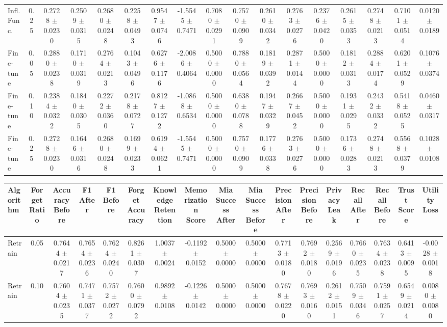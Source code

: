 \begin{table}[t]
\begin{tabular}{lcccccccccccccccc}
Infl. Func. & 0.25 & 0.2728 $\pm$ 0.0230 & 0.2509 $\pm$ 0.0315 & 0.2680 $\pm$ 0.0248 & 0.2258 $\pm$ 0.0493 & 0.9547 $\pm$ 0.0746 & -1.5545 $\pm$ 0.7471 & 0.7080 $\pm$ 0.0291 & 0.7570 $\pm$ 0.0909 & 0.2610 $\pm$ 0.0342 & 0.2763 $\pm$ 0.0276 & 0.2376 $\pm$ 0.0420 & 0.2615 $\pm$ 0.0353 & 0.2748 $\pm$ 0.0213 & 0.7101 $\pm$ 0.0514 & 0.0120 $\pm$ 0.0189 \\
Fine-tune & 0.05 & 0.2880 $\pm$ 0.0238 & 0.1710 $\pm$ 0.0319 & 0.2764 $\pm$ 0.0213 & 0.1043 $\pm$ 0.0496 & 0.6276 $\pm$ 0.1176 & -2.0086 $\pm$ 0.4064 & 0.5000 $\pm$ 0.0000 & 0.7880 $\pm$ 0.0564 & 0.1819 $\pm$ 0.0392 & 0.2871 $\pm$ 0.0144 & 0.5000 $\pm$ 0.0000 & 0.1812 $\pm$ 0.0313 & 0.2884 $\pm$ 0.0174 & 0.6201 $\pm$ 0.0529 & 0.1076 $\pm$ 0.0374 \\
Fine-tune & 0.10 & 0.2384 $\pm$ 0.0322 & 0.1840 $\pm$ 0.0305 & 0.2272 $\pm$ 0.0360 & 0.2178 $\pm$ 0.0727 & 0.8127 $\pm$ 0.1272 & -1.0868 $\pm$ 0.6534 & 0.5000 $\pm$ 0.0000 & 0.6380 $\pm$ 0.0788 & 0.1947 $\pm$ 0.0329 & 0.2667 $\pm$ 0.0452 & 0.5000 $\pm$ 0.0000 & 0.1931 $\pm$ 0.0295 & 0.2432 $\pm$ 0.0332 & 0.5418 $\pm$ 0.0525 & 0.0460 $\pm$ 0.0317 \\
Fine-tune & 0.25 & 0.2728 $\pm$ 0.0230 & 0.1646 $\pm$ 0.0316 & 0.2680 $\pm$ 0.0248 & 0.1699 $\pm$ 0.0233 & 0.6194 $\pm$ 0.0621 & -1.5545 $\pm$ 0.7471 & 0.5000 $\pm$ 0.0000 & 0.7570 $\pm$ 0.0909 & 0.1776 $\pm$ 0.0338 & 0.2763 $\pm$ 0.0276 & 0.5000 $\pm$ 0.0000 & 0.1736 $\pm$ 0.0283 & 0.2748 $\pm$ 0.0213 & 0.5568 $\pm$ 0.0379 & 0.1028 $\pm$ 0.0108 \\
\bottomrule
\end{tabular}
\vspace{2mm}
\begin{tabular}{lcccccccccccccccc}
\toprule
Algorithm & Forget Ratio & Accuracy Before & F1 After & F1 Before & Forget Accuracy & Knowledge Retention & Memorization Score & Mia Success After & Mia Success Before & Precision After & Precision Before & Privacy Leak & Recall After & Recall Before & Trust Score & Utility Loss \\
\midrule
Retrain & 0.05 & 0.7644 $\pm$ 0.0217 & 0.7654 $\pm$ 0.0236 & 0.7624 $\pm$ 0.0240 & 0.8261 $\pm$ 0.0307 & 1.0037 $\pm$ 0.0024 & -0.1192 $\pm$ 0.0152 & 0.5000 $\pm$ 0.0000 & 0.5000 $\pm$ 0.0000 & 0.7713 $\pm$ 0.0180 & 0.7692 $\pm$ 0.0180 & 0.2569 $\pm$ 0.0196 & 0.7660 $\pm$ 0.0235 & 0.7634 $\pm$ 0.0238 & 0.6413 $\pm$ 0.0095 & -0.0028 $\pm$ 0.0018 \\
Retrain & 0.10 & 0.7604 $\pm$ 0.0235 & 0.7471 $\pm$ 0.0377 & 0.7572 $\pm$ 0.0272 & 0.7600 $\pm$ 0.0792 & 0.9892 $\pm$ 0.0108 & -0.1226 $\pm$ 0.0142 & 0.5000 $\pm$ 0.0000 & 0.5000 $\pm$ 0.0000 & 0.7678 $\pm$ 0.0220 & 0.7693 $\pm$ 0.0160 & 0.2612 $\pm$ 0.0151 & 0.7509 $\pm$ 0.0346 & 0.7591 $\pm$ 0.0257 & 0.6549 $\pm$ 0.0214 & 0.0080 $\pm$ 0.0080 \\

\end{tabular}
\end{table}

